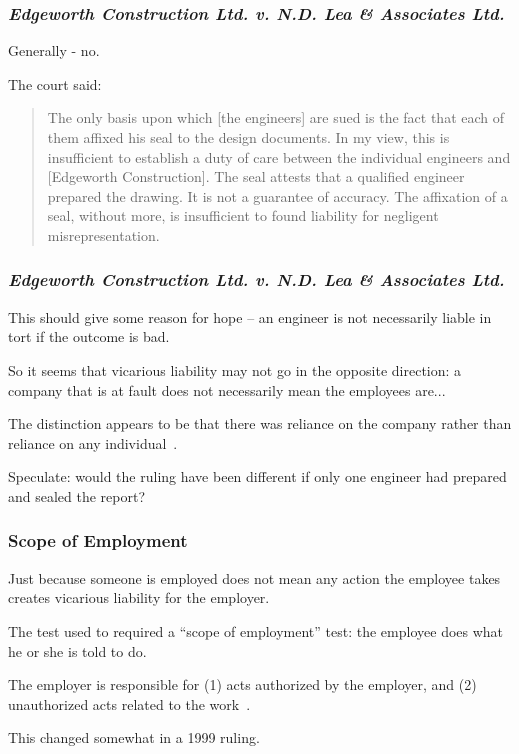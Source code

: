 \begin{frame}
\frametitle{\textit{Edgeworth Construction Ltd. v. N.D. Lea \& Associates Ltd.}}

Generally - no.

The court said:

\begin{quote}
The only basis upon which [the engineers] are sued is the fact that each of them affixed his seal to the design documents.  In my view, this is insufficient to establish a duty of care between the individual engineers and [Edgeworth Construction].  The seal attests that a qualified engineer prepared the drawing.  It is not a guarantee of accuracy.  The affixation of a seal, without more, is insufficient to found liability for negligent misrepresentation.
\end{quote} 

\end{frame}



\begin{frame}
\frametitle{\textit{Edgeworth Construction Ltd. v. N.D. Lea \& Associates Ltd.}}

This should give some reason for hope -- an engineer is not necessarily liable in tort if the outcome is bad.

So it seems that vicarious liability may not go in the opposite direction: a company that is at fault does not necessarily mean the employees are...

The distinction appears to be that there was reliance on the company rather than reliance on any individual~\cite{lpe}.

Speculate: would the ruling have been different if only one engineer had prepared and sealed the report?

\end{frame}



\begin{frame}
\frametitle{Scope of Employment}

Just because someone is employed does not mean any action the employee takes creates vicarious liability for the employer.

The test used to required a ``scope of employment'' test: the employee does what he or she is told to do.

The employer is responsible for (1) acts authorized by the employer, and (2) unauthorized acts related to the work~\cite{vicarious}.

This changed somewhat in a 1999 ruling.

\end{frame}



